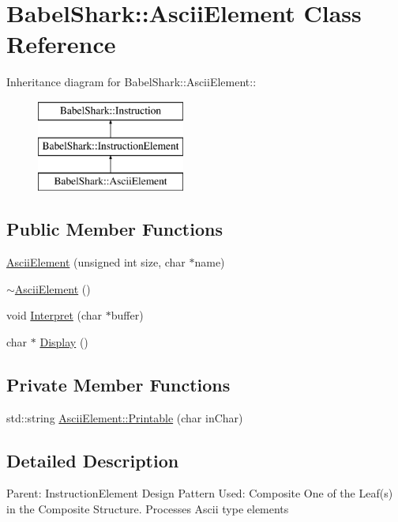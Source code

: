 \hypertarget{class_babel_shark_1_1_ascii_element}{
\section{BabelShark::AsciiElement Class Reference}
\label{class_babel_shark_1_1_ascii_element}
}
Inheritance diagram for BabelShark::AsciiElement::\begin{figure}[H]
\begin{center}
\leavevmode
\includegraphics[height=3cm]{class_babel_shark_1_1_ascii_element}
\end{center}
\end{figure}
\subsection*{Public Member Functions}
\begin{CompactItemize}
\item 
\hyperlink{class_babel_shark_1_1_ascii_element_d634e18161b86d3f0da9215606c6ce24}{AsciiElement} (unsigned int size, char $\ast$name)
\item 
\hyperlink{class_babel_shark_1_1_ascii_element_066a61d5d3f348ebc35d8c29de080e05}{$\sim$AsciiElement} ()
\item 
void \hyperlink{class_babel_shark_1_1_ascii_element_452958c460980a70b80d02b659c11057}{Interpret} (char $\ast$buffer)
\item 
char $\ast$ \hyperlink{class_babel_shark_1_1_ascii_element_a10391d6cea4ab7ad45be370fed9d4d0}{Display} ()
\end{CompactItemize}
\subsection*{Private Member Functions}
\begin{CompactItemize}
\item 
std::string \hyperlink{class_babel_shark_1_1_ascii_element_028fbaa4877f1ae574211247d68d0e70}{AsciiElement::Printable} (char inChar)
\end{CompactItemize}


\subsection{Detailed Description}
Parent: InstructionElement Design Pattern Used: Composite One of the Leaf(s) in the Composite Structure. Processes Ascii type elements 

